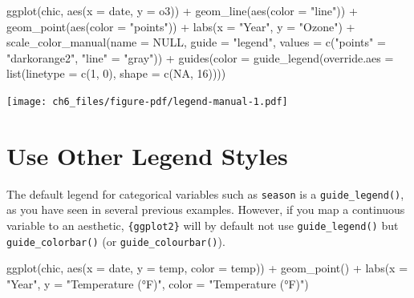 \documentclass[
  letterpaper,
  DIV=11,
  numbers=noendperiod]{scrreprt}
\newenvironment{Shaded}{\begin{snugshade}}{\end{snugshade}}
\newcommand{\AttributeTok}[1]{\textcolor[rgb]{0.40,0.45,0.13}{#1}}
\newcommand{\ConstantTok}[1]{\textcolor[rgb]{0.56,0.35,0.01}{#1}}
\newcommand{\DecValTok}[1]{\textcolor[rgb]{0.68,0.00,0.00}{#1}}
\newcommand{\FunctionTok}[1]{\textcolor[rgb]{0.28,0.35,0.67}{#1}}
\newcommand{\NormalTok}[1]{\textcolor[rgb]{0.00,0.23,0.31}{#1}}
\newcommand{\OtherTok}[1]{\textcolor[rgb]{0.00,0.23,0.31}{#1}}
\newcommand{\SpecialCharTok}[1]{\textcolor[rgb]{0.37,0.37,0.37}{#1}}
\newcommand{\StringTok}[1]{\textcolor[rgb]{0.13,0.47,0.30}{#1}}
\begin{document}
\begin{Shaded}
\begin{Highlighting}[]
\FunctionTok{ggplot}\NormalTok{(chic, }\FunctionTok{aes}\NormalTok{(}\AttributeTok{x =}\NormalTok{ date, }\AttributeTok{y =}\NormalTok{ o3)) }\SpecialCharTok{+}
  \FunctionTok{geom\_line}\NormalTok{(}\FunctionTok{aes}\NormalTok{(}\AttributeTok{color =} \StringTok{"line"}\NormalTok{)) }\SpecialCharTok{+}
  \FunctionTok{geom\_point}\NormalTok{(}\FunctionTok{aes}\NormalTok{(}\AttributeTok{color =} \StringTok{"points"}\NormalTok{)) }\SpecialCharTok{+}
  \FunctionTok{labs}\NormalTok{(}\AttributeTok{x =} \StringTok{"Year"}\NormalTok{, }\AttributeTok{y =} \StringTok{"Ozone"}\NormalTok{) }\SpecialCharTok{+}
  \FunctionTok{scale\_color\_manual}\NormalTok{(}\AttributeTok{name =} \ConstantTok{NULL}\NormalTok{,}
                     \AttributeTok{guide =} \StringTok{"legend"}\NormalTok{,}
                     \AttributeTok{values =} \FunctionTok{c}\NormalTok{(}\StringTok{"points"} \OtherTok{=} \StringTok{"darkorange2"}\NormalTok{,}
                                \StringTok{"line"} \OtherTok{=} \StringTok{"gray"}\NormalTok{)) }\SpecialCharTok{+}
  \FunctionTok{guides}\NormalTok{(}\AttributeTok{color =} \FunctionTok{guide\_legend}\NormalTok{(}\AttributeTok{override.aes =} \FunctionTok{list}\NormalTok{(}\AttributeTok{linetype =} \FunctionTok{c}\NormalTok{(}\DecValTok{1}\NormalTok{, }\DecValTok{0}\NormalTok{),}
                                                  \AttributeTok{shape =} \FunctionTok{c}\NormalTok{(}\ConstantTok{NA}\NormalTok{, }\DecValTok{16}\NormalTok{))))}
\end{Highlighting}
\end{Shaded}

\texttt{[image: ch6\_files/figure-pdf/legend-manual-1.pdf]}

\section{Use Other Legend Styles}\label{use-other-legend-styles}

The default legend for categorical variables such as \texttt{season} is
a \texttt{guide\_legend()}, as you have seen in several previous
examples. However, if you map a continuous variable to an aesthetic,
\texttt{\{ggplot2\}} will by default not use \texttt{guide\_legend()}
but \texttt{guide\_colorbar()} (or \texttt{guide\_colourbar()}).

\begin{Shaded}
\begin{Highlighting}[]
\FunctionTok{ggplot}\NormalTok{(chic,}
       \FunctionTok{aes}\NormalTok{(}\AttributeTok{x =}\NormalTok{ date, }\AttributeTok{y =}\NormalTok{ temp, }\AttributeTok{color =}\NormalTok{ temp)) }\SpecialCharTok{+}
  \FunctionTok{geom\_point}\NormalTok{() }\SpecialCharTok{+}
  \FunctionTok{labs}\NormalTok{(}\AttributeTok{x =} \StringTok{"Year"}\NormalTok{, }\AttributeTok{y =} \StringTok{"Temperature (°F)"}\NormalTok{, }\AttributeTok{color =} \StringTok{"Temperature (°F)"}\NormalTok{)}
\end{Highlighting}
\end{Shaded}
\end{document}
